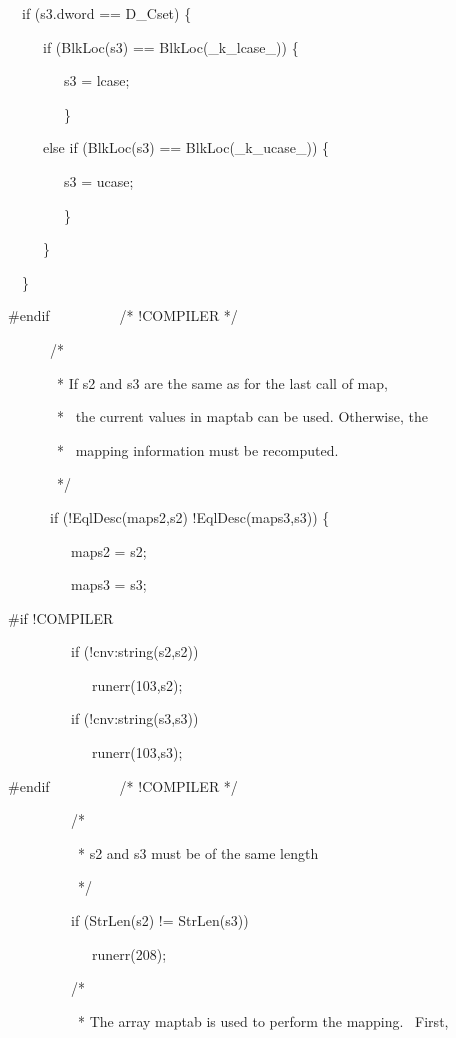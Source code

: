 \ \  if (s3.dword == D\_Cset) \{


\ \  \ \ \ if (BlkLoc(s3) == BlkLoc(\_k\_lcase\_)) \{


\ \  \ \ \ \ \ \ s3 = lcase;


\ \  \ \ \ \ \ \ \}


\ \  \ \ \ else if (BlkLoc(s3) == BlkLoc(\_k\_ucase\_)) \{


\ \  \ \ \ \ \ \ s3 = ucase;


\ \  \ \ \ \ \ \ \}


\ \  \ \ \ \}


\ \  \}


\#endif\ \ \ \ \ \ \ \ \ \ /* !COMPILER */


\bigskip


\ \ \ \ \ \ /*


\ \ \ \ \ \ \ * If s2 and s3 are the same as for the last call of map,


\ \ \ \ \ \ \ * \ the current values in maptab can be used. Otherwise, the


\ \ \ \ \ \ \ * \ mapping information must be recomputed.


\ \ \ \ \ \ \ */


\ \ \ \ \ \ if (!EqlDesc(maps2,s2) {\textbar}{\textbar} !EqlDesc(maps3,s3)) \{


\ \ \ \ \ \ \ \ \ maps2 = s2;


\ \ \ \ \ \ \ \ \ maps3 = s3;


\bigskip


\#if !COMPILER


\ \ \ \ \ \ \ \ \ if (!cnv:string(s2,s2))


\ \ \ \ \ \ \ \ \ \ \ \ runerr(103,s2);


\ \ \ \ \ \ \ \ \ if (!cnv:string(s3,s3))


\ \ \ \ \ \ \ \ \ \ \ \ runerr(103,s3);


\#endif\ \ \ \ \ \ \ \ \ \ /* !COMPILER */


\ \ \ \ \ \ \ \ \ /*


\ \ \ \ \ \ \ \ \ \ * s2 and s3 must be of the same length


\ \ \ \ \ \ \ \ \ \ */


\ \ \ \ \ \ \ \ \ if (StrLen(s2) != StrLen(s3))


\ \ \ \ \ \ \ \ \ \ \ \ runerr(208);


\bigskip


\ \ \ \ \ \ \ \ \ /*


\ \ \ \ \ \ \ \ \ \ * The array maptab is used to perform the mapping. \ First,



